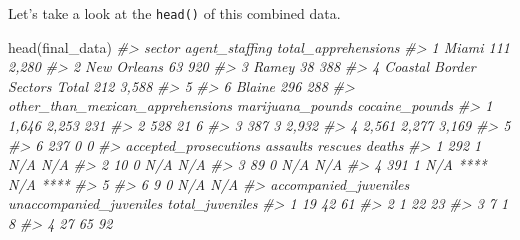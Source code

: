 \documentclass[
]{krantz}
\makeatletter
\newenvironment{Shaded}{\begin{snugshade}}{\end{snugshade}}
\newcommand{\CommentTok}[1]{\textcolor[rgb]{0.37,0.37,0.37}{\textit{#1}}}
\newcommand{\FunctionTok}[1]{\textcolor[rgb]{0,0,0}{#1}}
\newcommand{\NormalTok}[1]{#1}
\newenvironment{kframe}{%
\medskip{}
\setlength{\fboxsep}{.8em}
 \def\at@end@of@kframe{}%
 \ifinner\ifhmode%
  \def\at@end@of@kframe{\end{minipage}}%
  \begin{minipage}{\columnwidth}%
 \fi\fi%
 \def\FrameCommand##1{\hskip\@totalleftmargin \hskip-\fboxsep
 \colorbox{shadecolor}{##1}\hskip-\fboxsep
     \hskip-\linewidth \hskip-\@totalleftmargin \hskip\columnwidth}%
 \MakeFramed {\advance\hsize-\width
   \@totalleftmargin\z@ \linewidth\hsize
   \@setminipage}}%
 {\par\unskip\endMakeFramed%
 \at@end@of@kframe}
\renewenvironment{Shaded}{\begin{kframe}}{\end{kframe}}
\makeatother
\begin{document}
Let's take a look at the \texttt{head()} of this combined data.

\begin{Shaded}
\begin{Highlighting}[]
\FunctionTok{head}\NormalTok{(final\_data)}
\CommentTok{\#\textgreater{}                         sector agent\_staffing total\_apprehensions}
\CommentTok{\#\textgreater{} 1                        Miami            111               2,280}
\CommentTok{\#\textgreater{} 2                  New Orleans             63                 920}
\CommentTok{\#\textgreater{} 3                        Ramey             38                 388}
\CommentTok{\#\textgreater{} 4 Coastal Border Sectors Total            212               3,588}
\CommentTok{\#\textgreater{} 5                                                                }
\CommentTok{\#\textgreater{} 6                       Blaine            296                 288}
\CommentTok{\#\textgreater{}   other\_than\_mexican\_apprehensions marijuana\_pounds cocaine\_pounds}
\CommentTok{\#\textgreater{} 1                            1,646            2,253            231}
\CommentTok{\#\textgreater{} 2                              528               21              6}
\CommentTok{\#\textgreater{} 3                              387                3          2,932}
\CommentTok{\#\textgreater{} 4                            2,561            2,277          3,169}
\CommentTok{\#\textgreater{} 5                                                                 }
\CommentTok{\#\textgreater{} 6                              237                0              0}
\CommentTok{\#\textgreater{}   accepted\_prosecutions assaults  rescues   deaths}
\CommentTok{\#\textgreater{} 1                   292        1      N/A      N/A}
\CommentTok{\#\textgreater{} 2                    10        0      N/A      N/A}
\CommentTok{\#\textgreater{} 3                    89        0      N/A      N/A}
\CommentTok{\#\textgreater{} 4                   391        1 N/A **** N/A ****}
\CommentTok{\#\textgreater{} 5                                                 }
\CommentTok{\#\textgreater{} 6                     9        0      N/A      N/A}
\CommentTok{\#\textgreater{}   accompanied\_juveniles unaccompanied\_juveniles total\_juveniles}
\CommentTok{\#\textgreater{} 1                    19                      42              61}
\CommentTok{\#\textgreater{} 2                     1                      22              23}
\CommentTok{\#\textgreater{} 3                     7                       1               8}
\CommentTok{\#\textgreater{} 4                    27                      65              92}

\end{Highlighting}
\end{Shaded}
\end{document}

